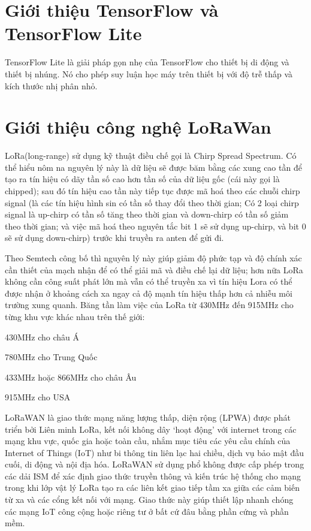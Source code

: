 \label{chap:ontology}
\section{Giới thiệu TensorFlow và TensorFlow Lite}
TensorFlow Lite là giải pháp gọn nhẹ của TensorFlow cho thiết bị di động và thiết bị nhúng.
Nó cho phép suy luận học máy trên thiết bị với độ trễ thấp và kích thước nhị phân nhỏ.




\section{Giới thiệu công nghệ LoRaWan}
LoRa(long-range) sử dụng kỹ thuật điều chế gọi là Chirp Spread Spectrum.
Có thể hiểu nôm na nguyên lý này là dữ liệu sẽ được băm bằng các xung cao tần để tạo ra tín hiệu có dãy tần số cao hơn tần số của dữ liệu gốc (cái này gọi là chipped); sau đó tín hiệu cao tần này tiếp tục được mã hoá theo các chuỗi chirp signal (là các tín hiệu hình sin có tần số thay đổi theo thời gian; 
Có 2 loại chirp signal là up-chirp có tần số tăng theo thời gian và down-chirp có tần số giảm theo thời gian; và việc mã hoá theo nguyên tắc bit 1 sẽ sử dụng up-chirp, và bit 0 sẽ sử dụng down-chirp) trước khi truyền ra anten để gửi đi.

Theo Semtech công bố thì nguyên lý này giúp giảm độ phức tạp và độ chính xác cần thiết của mạch nhận để có thể giải mã và điều chế lại dữ liệu; hơn nữa LoRa không cần công suất phát lớn mà vẫn có thể truyền xa vì tín hiệu Lora có thể được nhận ở khoảng cách xa ngay cả độ mạnh tín hiệu thấp hơn cả nhiễu môi trường xung quanh.
Băng tần làm việc của LoRa từ 430MHz đến 915MHz cho từng khu vực khác nhau trên thế giới:

430MHz cho châu Á

780MHz cho Trung Quốc

433MHz hoặc 866MHz cho châu Âu

915MHz cho USA

LoRaWAN là giao thức mạng năng lượng thấp, diện rộng (LPWA) được phát triển bởi Liên minh LoRa, kết nối không dây ‘hoạt động’ với internet trong các mạng khu vực, quốc gia hoặc toàn cầu, nhắm mục tiêu các yêu cầu chính của Internet of Things (IoT) như bi thông tin liên lạc hai chiều, dịch vụ bảo mật đầu cuối, di động và nội địa hóa.
LoRaWAN sử dụng phổ không được cấp phép trong các dải ISM để xác định giao thức truyền thông và kiến ​​trúc hệ thống cho mạng trong khi lớp vật lý LoRa tạo ra các liên kết giao tiếp tầm xa giữa các cảm biến từ xa và các cổng kết nối với mạng. Giao thức này giúp thiết lập nhanh chóng các mạng IoT công cộng hoặc riêng tư ở bất cứ đâu bằng phần cứng và phần mềm.


